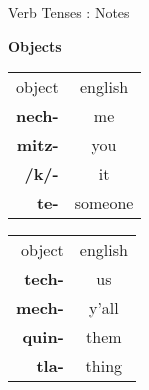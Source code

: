\documentclass[12pt]{beamer}
\begin{document}
\begin{frame}
\begin{columns}[t]
\begin{column}{.23\linewidth}
\begin{block}{Verb Tenses : Notes}
    		\begin{center}
    			\textbf{Objects}
    		\end{center}
    		\begin{center}
    			\begin{tabular}[t]{r|c|}
    				object		   & english	\\
    				\cline{1-2}
    				\textbf{nech-} & me				\\
    				\textbf{mitz-} & you		 	\\
    				\textbf{/k/-}  & it				\\
    				\textbf{te-}  & someone		 	\\
    			\end{tabular}%
    			\begin{tabular}[t]{|r|c}
    				object		   & english	\\
    				\cline{1-2}
    				\textbf{tech-} & us				\\
    				\textbf{mech-} & y'all			\\
    				\textbf{quin-} & them			\\
    				\textbf{tla-}  & thing		 	\\
    			\end{tabular}%
    		\end{center}
    		

\end{block}
\end{column}
\end{columns}
\end{frame}
\end{document}
